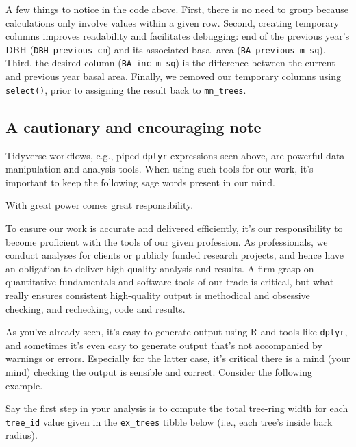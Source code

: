 \documentclass[
  11pt,
]{krantz}
\renewenvironment{quote}{\begin{VF}}{\end{VF}}
\theoremstyle{definition}
\theoremstyle{definition}
\theoremstyle{definition}
\theoremstyle{definition}
\theoremstyle{remark}
\begin{document}
A few things to notice in the code above. First, there is no need to group because calculations only involve values within a given row. Second, creating temporary columns improves readability and facilitates debugging: end of the previous year's DBH (\texttt{DBH\_previous\_cm}) and its associated basal area (\texttt{BA\_previous\_m\_sq}). Third, the desired column (\texttt{BA\_inc\_m\_sq}) is the difference between the current and previous year basal area. Finally, we removed our temporary columns using \texttt{select()}, prior to assigning the result back to \texttt{mn\_trees}.

\hypertarget{dplyrCaution}{%
\subsection{A cautionary and encouraging note}\label{dplyrCaution}}

Tidyverse workflows, e.g., piped \texttt{dplyr} expressions seen above, are powerful data manipulation and analysis tools. When using such tools for our work, it's important to keep the following sage words present in our mind.

\begin{quote}
With great power comes great responsibility.

\end{quote}

To ensure our work is accurate and delivered efficiently, it's our responsibility to become proficient with the tools of our given profession. As professionals, we conduct analyses for clients or publicly funded research projects, and hence have an obligation to deliver high-quality analysis and results. A firm grasp on quantitative fundamentals and software tools of our trade is critical, but what really ensures consistent high-quality output is methodical and obsessive checking, and rechecking, code and results.

As you've already seen, it's easy to generate output using R and tools like \texttt{dplyr}, and sometimes it's even easy to generate output that's not accompanied by warnings or errors. Especially for the latter case, it's critical there is a mind (your mind) checking the output is sensible and correct. Consider the following example.

Say the first step in your analysis is to compute the total tree-ring width for each \texttt{tree\_id} value given in the \texttt{ex\_trees} tibble below (i.e., each tree's inside bark radius).
\end{document}
